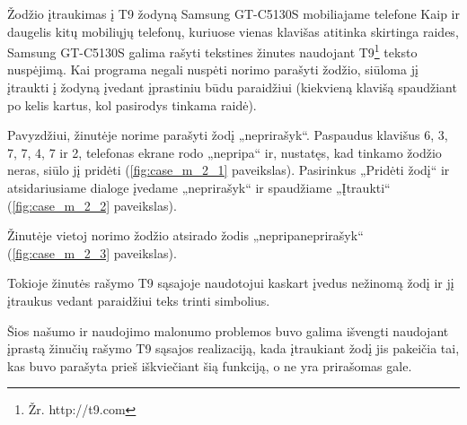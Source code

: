 \begin{xcase}{Žodžio įtraukimas į T9 žodyną Samsung GT-C5130S mobiliajame
              telefone}
  \xcgoal
  {
    Kaip ir daugelis kitų mobiliųjų telefonų, kuriuose vienas klavišas
    atitinka skirtinga raides, Samsung GT-C5130S galima rašyti tekstines
    žinutes naudojant T9\footnote{Žr. http://t9.com} teksto nuspėjimą. Kai
    programa negali nuspėti norimo parašyti žodžio, siūloma jį įtraukti į
    žodyną įvedant įprastiniu būdu paraidžiui (kiekvieną klavišą spaudžiant
    po kelis kartus, kol pasirodys tinkama raidė).
  }
  
  \xctools
  { %
    Pavyzdžiui, žinutėje norime parašyti žodį „neprirašyk“. Paspaudus
    klavišus 6, 3, 7, 7, 4, 7 ir 2, telefonas ekrane rodo „nepripa“ ir,
    nustatęs, kad tinkamo žodžio neras, siūlo jį pridėti
    (\ref{fig:case_m_2_1} paveikslas). Pasirinkus „Pridėti žodį“ ir
    atsidariusiame dialoge įvedame „neprirašyk“ ir spaudžiame
    „Įtraukti“ (\ref{fig:case_m_2_2} paveikslas).
  }

  {
  }
  
  \xcresult
  {
    Žinutėje vietoj norimo žodžio atsirado žodis „nepripaneprirašyk“ (\ref{fig:case_m_2_3} paveikslas).
  }
  
  \xcprinciples
  {
    {
      Tokioje žinutės rašymo T9 sąsajoje naudotojui kaskart įvedus nežinomą
      žodį ir jį įtraukus vedant paraidžiui teks trinti simbolius.
    }
  }
  
  \xcthoughts
  {
    Šios našumo ir naudojimo malonumo problemos buvo galima išvengti
    naudojant įprastą žinučių rašymo T9 sąsajos realizaciją, kada įtraukiant
    žodį jis pakeičia tai, kas buvo parašyta prieš iškviečiant šią funkciją,
    o ne yra prirašomas gale.
  }
\end{xcase}
